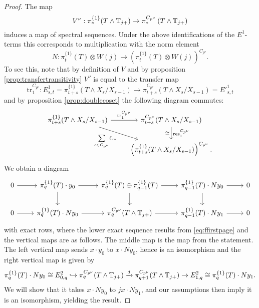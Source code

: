 \begin{proof}
The map $$V^\nu: \pi^{\{1\}}_\ast(T\wedge \mathbb{T}_{j+})\rightarrow 
\pi^{C_{p^\nu}}_\ast\left( T\wedge \mathbb{T}_{j+}\right)$$ induces a map of spectral sequences.
Under the above identifications of the $E^1$-terms this corresponds to multiplication with the norm element
$$N:\pi^{\{1\}}_t(T)\otimes W(j)\rightarrow \left(\pi^{\{ 1 \} }_t(T)\otimes W(j)\right)^{C_{p^\nu}}.$$
To see this, note that by definition of $V$ and by proposition \ref{prop:transfertransitivity}
$V^\nu$ is equal to the transfer map
\[
\mathrm{tr}^{C_{p^\nu}}_1:E^1_{s,t} = \pi_{t+s}^{\{1\}}(T\wedge X_s/X_{s-1})\to 
\pi_{t+s}^{C_{p^\nu}}(T\wedge X_s/X_{s-1}) = E'^1_{s,t}
\]
and by proposition \ref{prop:doublecoset} the following diagram commutes:
\[
\begin{tikzcd}
\pi_{t+s}^{\{1\}}(T\wedge X_s/X_{s-1})
\arrow{r}{\mathrm{tr}^{C_{p^\nu}}_1} \arrow{dr}[swap]{\underset{c\in C_{p^\nu}}{\sum}\ell_{c\ast}}
&\pi_{t+s}^{C_{p^\nu}}(T\wedge X_s/X_{s-1})
\arrow{d}[swap]{\cong}{\mathrm{res}^{C_{p^\nu}}_1}\\
&\left(\pi_{t+s}^{\{1\}}(T\wedge X_s/X_{s-1})\right)^{C_{p^\nu}}.
\end{tikzcd}
\]
We obtain a diagram
$$
\begin{tikzcd}
0\arrow{r} &\pi^{\{1\}}_q(T)\cdot y_0 \arrow{r} \arrow{d} 
&\pi^{\{1\}}_q(T)\oplus \pi^{\{1\}}_{q-1}(T)\arrow{r} \arrow{d} 
&\pi^{\{1\}}_{q-1}(T)\cdot Ny_0 \arrow{r} \arrow{d} & 0\\
0\arrow{r} &\pi^{\{1\}}_q(T)\cdot Ny_0 \arrow{r} &\pi^{C_{p^\nu}}_q(T\wedge \TT_{j+})\arrow{r} &\pi^{\{1\}}_{q-1}(T)\cdot Ny_1\arrow{r} & 0
\end{tikzcd}
$$
with exact rows, where the lower exact sequence results from
\eqref{eq:ffirstpage} and the vertical maps are as follows. The middle map is the map from the statement.
The left vertical map 
sends $x\cdot y_0$ to $x\cdot Ny_0$, hence is an isomorphism and the right vertical map is given by
\begin{equation}\label{eq:mainmap}
\pi^{\{1\}}_q(T)\cdot Ny_0\cong E^2_{0,q}\hookrightarrow \pi^{C_{p^\nu}}_q(T\wedge\mathbb{T}_{j+})\xrightarrow{d} 
\pi^{C_{p^\nu}}_{q+1}(T\wedge\mathbb{T}_{j+})\rightarrow E^2_{1,q}\cong \pi_q^{\{1\}}(T)\cdot Ny_1.
\end{equation}
We will show that it takes $x\cdot Ny_0$ to $jx\cdot Ny_1$,
and our assumptions then imply it is an isomorphism, yielding the result.


\end{proof}
